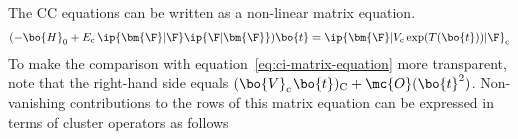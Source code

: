 \begin{rmk}
\label{rmk:cc-perturbative-analysis}
The CC equations can be written as a non-linear matrix equation.
\begin{align}
\label{eq:cc-matrix-equation}
(
-
  \bo{H}_0
+
  E_{\text{c}}\,
  \ip{\bm{\F}|\F}
  \ip{\F|\bm{\F}}
)
  \bo{t}
=
  \ip{\bm{\F}|
    V_{\text{c}}\,
    \text{exp}(T(\bo{t}))
  |\F}_{\text{c}}
\end{align}
To make the comparison with equation~\ref{eq:ci-matrix-equation} more transparent, note that the right-hand side equals
$
  (
    \bo{V}_{\text{c}}\hspace{0.8pt}
    \bo{t}
  )_{\text{C}}
+
  \mc{O}(\bo{t}^2)
$.
Non-vanishing contributions to the rows of this matrix equation can be expressed in terms of cluster operators as follows

\end{rmk}
